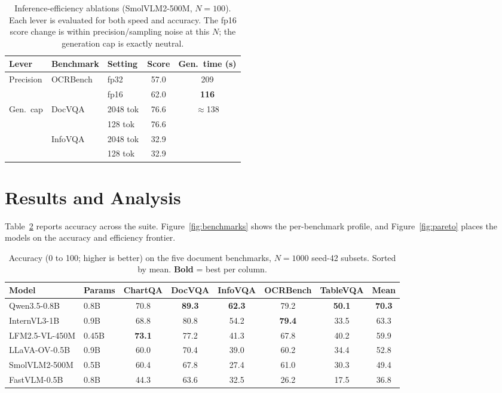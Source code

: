 \documentclass{article}
\newcommand{\best}[1]{\textbf{#1}}
\begin{document}
\begin{table}[t]
\caption{Inference-efficiency ablations (SmolVLM2-500M, $N{=}100$). Each lever
is evaluated for both speed and accuracy. The fp16 score change is within
precision/sampling noise at this $N$; the generation cap is exactly neutral.}
\label{tab:ablation}
\centering
\small
\begin{tabular}{@{}lllcc@{}}
\toprule
Lever & Benchmark & Setting & Score & Gen.\ time (s) \\
\midrule
\multirow{2}{*}{Precision} & \multirow{2}{*}{OCRBench} & fp32 & 57.0 & 209 \\
                           &                           & fp16 & 62.0 & \best{116} \\
\midrule
\multirow{4}{*}{Gen.\ cap} & \multirow{2}{*}{DocVQA}  & 2048 tok & 76.6 & \multirow{4}{*}{$\approx$138} \\
                           &                          & 128 tok  & 76.6 & \\
                           & \multirow{2}{*}{InfoVQA} & 2048 tok & 32.9 & \\
                           &                          & 128 tok  & 32.9 & \\
\bottomrule
\end{tabular}
\end{table}

\section{Results and Analysis}
\label{sec:results}

Table~\ref{tab:main} reports accuracy across the suite.
Figure~\ref{fig:benchmarks} shows the per-benchmark profile, and
Figure~\ref{fig:pareto} places the models on the accuracy and efficiency
frontier.

\begin{table}[t]
\caption{Accuracy (0 to 100; higher is better) on the five document benchmarks,
$N{=}1000$ seed-42 subsets. Sorted by mean. \best{Bold} = best per column.}
\label{tab:main}
\centering
\small
\begin{tabular}{@{}llcccccc@{}}
\toprule
Model & Params & ChartQA & DocVQA & InfoVQA & OCRBench & TableVQA & \best{Mean} \\
\midrule
Qwen3.5-0.8B    & 0.8B  & 70.8 & \best{89.3} & \best{62.3} & 79.2 & \best{50.1} & \best{70.3} \\
InternVL3-1B    & 0.9B  & 68.8 & 80.8 & 54.2 & \best{79.4} & 33.5 & 63.3 \\
LFM2.5-VL-450M  & 0.45B & \best{73.1} & 77.2 & 41.3 & 67.8 & 40.2 & 59.9 \\
LLaVA-OV-0.5B   & 0.9B  & 60.0 & 70.4 & 39.0 & 60.2 & 34.4 & 52.8 \\
SmolVLM2-500M   & 0.5B  & 60.4 & 67.8 & 27.4 & 61.0 & 30.3 & 49.4 \\
FastVLM-0.5B    & 0.8B  & 44.3 & 63.6 & 32.5 & 26.2 & 17.5 & 36.8 \\
\bottomrule
\end{tabular}
\end{table}
\end{document}
